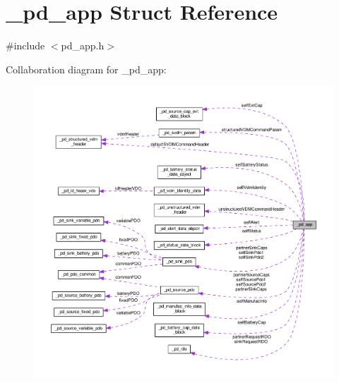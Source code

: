 \hypertarget{struct__pd__app}{\section{\-\_\-pd\-\_\-app Struct Reference}
\label{struct__pd__app}
}


{\ttfamily \#include $<$pd\-\_\-app.\-h$>$}



Collaboration diagram for \-\_\-pd\-\_\-app\-:
\nopagebreak
\begin{figure}[H]
\begin{center}
\leavevmode
\includegraphics[width=350pt]{struct__pd__app__coll__graph}
\end{center}
\end{figure}
